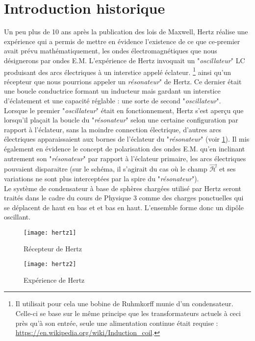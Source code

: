 \section{Introduction historique}
Un peu plus de 10 ans après la publication des lois de Maxwell, Hertz réalise une expérience qui a permis de mettre en évidence l'existence de ce que ce-premier avait prévu mathématiquement, les ondes électromagnétiques que nous désignerons par ondes E.M. L'expérience de Hertz invoquait un "\textit{oscillateur}" LC produisant des arcs électriques à un interstice appelé éclateur. \footnote{Il utilisait pour cela une bobine de Ruhmkorff munie d'un condensateur. Celle-ci se base sur le même principe que les transformateurs actuels à ceci près qu'à son entrée, seule une alimentation continue était requise : \url{https://en.wikipedia.org/wiki/Induction_coil}.} ainsi qu'un récepteur que nous pourrions appeler un \textit{résonateur}" de Hertz. Ce dernier était une boucle conductrice formant un inducteur mais gardant un interstice d'éclatement et une capacité réglable : une sorte de second "\textit{oscillateur}". \\Lorsque le premier "\textit{oscillateur}" était en fonctionnement, Hertz s'est aperçu que lorsqu'il plaçait la boucle du "\textit{résonateur}" selon une certaine configuration par rapport à l'éclateur, sans la moindre connection électrique, d'autres arcs électriques apparaissaient aux bornes de l'éclateur du "\textit{résonateur}" (voir \ref{fig:expHertz}). Il mis également en évidence le concept de polarisation des ondes E.M. qu'en inclinant autrement son "\textit{résonateur}" par rapport à l'éclateur primaire, les arcs électriques pouvaient disparaitre (sur le schéma, il s'agirait du cas où le champ $\vec{\mathcal{H}}$ et ses variations ne sont plus interceptées par la spire du "\textit{résonateur}"). \\
Le système de condensateur à base de sphères chargées utilisé par Hertz seront traités dans le cadre du cours de Physique 3 comme des charges ponctuelles qui se déplacent de haut en bas et et bas en haut. L'ensemble forme donc un dipôle oscillant.
\begin{figure}[h]
	\begin{minipage}[l]{.5\linewidth}\centering
		\texttt{[image: hertz1]}
		\caption{Récepteur de Hertz}
	\end{minipage}
	\begin{minipage}[]{.5\linewidth}\centering
		\texttt{[image: hertz2]}
		\label{fig:expHertz}
		\caption{Expérience de Hertz} 
	\end{minipage}
\end{figure}

